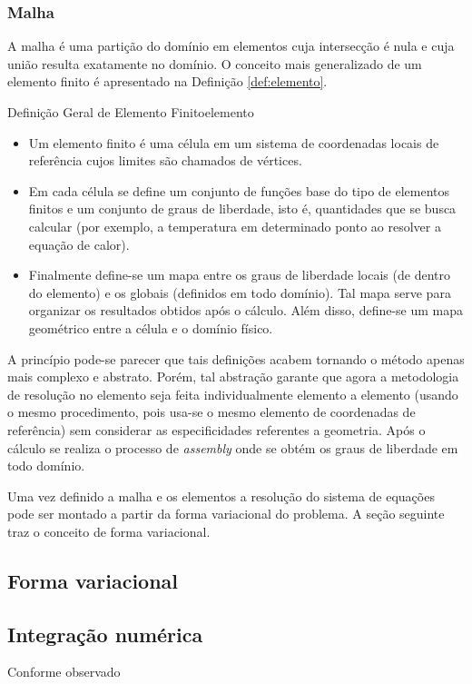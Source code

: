     \subsubsection{Malha}
    A malha é uma partição do domínio em elementos cuja intersecção é nula e
    cuja união resulta exatamente no domínio. O conceito mais generalizado de um
    elemento finito é apresentado na Definição \ref{def:elemento}.

    \begin{Definition}{Definição Geral de Elemento Finito}{elemento}
      \begin{itemize}
        \item Um elemento finito é uma célula em um sistema de coordenadas
      locais de referência cujos limites são chamados de vértices.

        \item Em cada célula se define um conjunto de funções base do tipo de elementos
      finitos e um conjunto de graus de liberdade, isto é, quantidades que se
      busca calcular (por exemplo, a temperatura em determinado ponto ao resolver
      a equação de calor).

     
        \item Finalmente define-se um mapa entre os graus de liberdade locais (de dentro
      do elemento) e os globais (definidos em todo domínio). Tal mapa serve para
      organizar os resultados obtidos após o cálculo. Além disso, define-se um
      mapa geométrico entre a célula e o domínio físico.
      \end{itemize}
      \end{Definition}

    A princípio pode-se parecer que tais definições acabem tornando o método
    apenas mais complexo e abstrato. Porém, tal abstração garante que agora a
    metodologia de resolução no elemento seja feita individualmente elemento a
    elemento (usando o mesmo procedimento, pois usa-se o mesmo elemento de
    coordenadas de referência) sem considerar as especificidades
    referentes a geometria. Após o cálculo se realiza o processo de
    \textit{assembly} onde se obtém os graus de liberdade em todo domínio.

    Uma vez definido a malha e os elementos a resolução do sistema de equações
    pode ser montado a partir da forma variacional do problema. A seção seguinte
    traz o conceito de forma variacional.

    \subsection{Forma variacional}
    
    \subsection{Integração numérica}
    Conforme observado 
